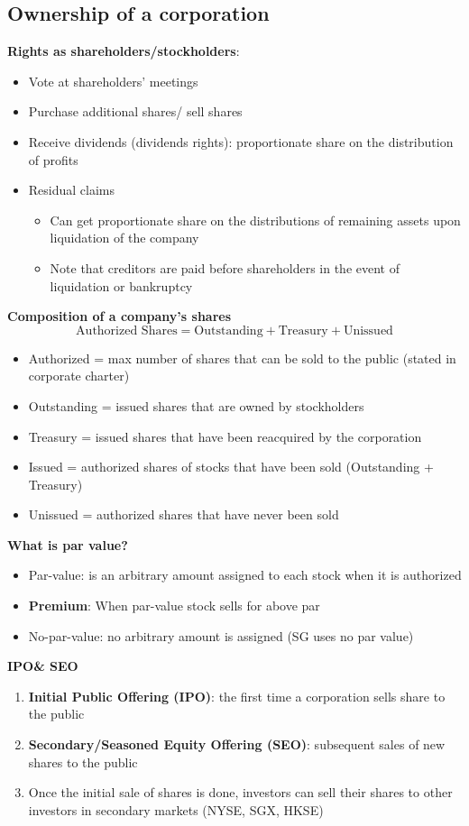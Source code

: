 \documentclass{article}
\begin{document}
\begin{multicols}{2}
\subsection{Ownership of a corporation}
\textbf{Rights as shareholders/stockholders}:
\begin{itemize}
	\item Vote at shareholders' meetings
	\item Purchase additional shares/ sell shares
	\item Receive dividends (dividends rights): proportionate share on the distribution of profits
	\item Residual claims
	\begin{itemize}
		\item Can get proportionate share on the distributions of remaining assets upon liquidation of the company
		\item Note that creditors are paid before shareholders in the event of liquidation or bankruptcy\vspace{0.5em}
	\end{itemize}
\end{itemize}
\textbf{Composition of a company's shares}
$$\text{Authorized Shares} = \text{Outstanding} + \text{Treasury} + \text{Unissued}$$
\begin{itemize}
	\item Authorized = max number of shares that can be sold to the public (stated in corporate charter)
	\item Outstanding = issued shares that are owned by stockholders
	\item Treasury = issued shares that have been reacquired by the corporation
	\item Issued = authorized shares of stocks that have been sold (Outstanding + Treasury)
	\item Unissued = authorized shares that have never been sold
\end{itemize}
\textbf{What is par value?}
\begin{itemize}
	\item Par-value: is an arbitrary amount assigned to each stock when it is authorized
	\item \textbf{Premium}: When par-value stock sells for above par
	\item No-par-value: no arbitrary amount is assigned (SG uses no par value)
\end{itemize}
\textbf{IPO\& SEO}
\begin{enumerate}
	\item \textbf{Initial Public Offering (IPO)}: the first time a corporation sells share to the public
	\item \textbf{Secondary/Seasoned Equity Offering (SEO)}: subsequent sales of new shares to the public
	\item Once the initial sale of shares is done, investors can sell their shares to other investors in secondary markets (NYSE, SGX, HKSE)
\end{enumerate}



\end{multicols}
\end{document}
